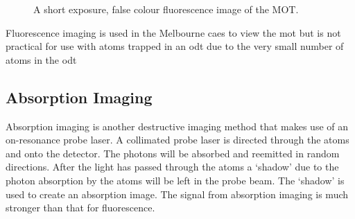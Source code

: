 \begin{figure}[h]
\centering


\caption{A short exposure, false colour fluorescence image of the MOT.}
\end{figure}

Fluorescence imaging is used in the Melbourne \gls{caes} to view the \gls{mot} but is not practical for use with atoms trapped in an \gls{odt} due to the very  small number of atoms in the \gls{odt}

\subsection{Absorption Imaging}

Absorption imaging is another destructive imaging method that makes use of an on-resonance probe laser. A collimated probe laser is directed through the atoms and onto the detector. The photons will be absorbed and reemitted in random directions. After the light has passed through the atoms a `shadow' due to the photon absorption by the atoms will be left in the probe beam. The `shadow' is used to create an absorption image. The signal from absorption imaging is much stronger than that for fluorescence.

